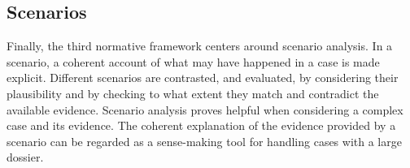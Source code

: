 \documentclass[10pt]{article}
\begin{document}
%
%
%

\subsection{Scenarios}
\label{sec:introScen}
Finally, the third normative framework %
centers around scenario analysis. In a scenario, a coherent account of what may have happened in a case is made explicit. Different scenarios are contrasted, and evaluated, by considering their plausibility and by checking to what extent they match and contradict the available evidence. 
Scenario analysis proves helpful when considering a complex case and its evidence. The coherent explanation of the evidence provided by 
a scenario can be regarded as a sense-making tool for handling cases with a large dossier. 
\end{document}
